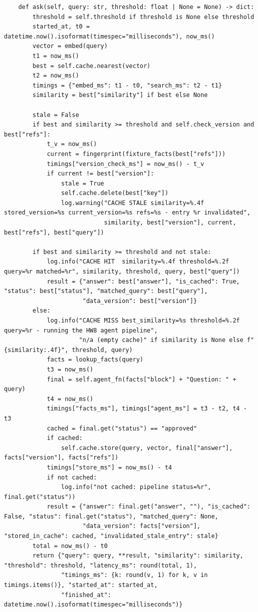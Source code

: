 \documentclass[11pt]{article}
\begin{document}
\begingroup\lstset{basicstyle=\ttfamily\tiny}
\begin{lstlisting}
    def ask(self, query: str, threshold: float | None = None) -> dict:
        threshold = self.threshold if threshold is None else threshold
        started_at, t0 = datetime.now().isoformat(timespec="milliseconds"), now_ms()
        vector = embed(query)
        t1 = now_ms()
        best = self.cache.nearest(vector)
        t2 = now_ms()
        timings = {"embed_ms": t1 - t0, "search_ms": t2 - t1}
        similarity = best["similarity"] if best else None

        stale = False
        if best and similarity >= threshold and self.check_version and best["refs"]:
            t_v = now_ms()
            current = fingerprint(fixture_facts(best["refs"]))
            timings["version_check_ms"] = now_ms() - t_v
            if current != best["version"]:
                stale = True
                self.cache.delete(best["key"])
                log.warning("CACHE STALE similarity=%.4f stored_version=%s current_version=%s refs=%s - entry %r invalidated",
                            similarity, best["version"], current, best["refs"], best["query"])

        if best and similarity >= threshold and not stale:
            log.info("CACHE HIT  similarity=%.4f threshold=%.2f query=%r matched=%r", similarity, threshold, query, best["query"])
            result = {"answer": best["answer"], "is_cached": True, "status": best["status"], "matched_query": best["query"],
                      "data_version": best["version"]}
        else:
            log.info("CACHE MISS best_similarity=%s threshold=%.2f query=%r - running the HW8 agent pipeline",
                     "n/a (empty cache)" if similarity is None else f"{similarity:.4f}", threshold, query)
            facts = lookup_facts(query)
            t3 = now_ms()
            final = self.agent_fn(facts["block"] + "Question: " + query)
            t4 = now_ms()
            timings["facts_ms"], timings["agent_ms"] = t3 - t2, t4 - t3
            cached = final.get("status") == "approved"
            if cached:
                self.cache.store(query, vector, final["answer"], facts["version"], facts["refs"])
            timings["store_ms"] = now_ms() - t4
            if not cached:
                log.info("not cached: pipeline status=%r", final.get("status"))
            result = {"answer": final.get("answer", ""), "is_cached": False, "status": final.get("status"), "matched_query": None,
                      "data_version": facts["version"], "stored_in_cache": cached, "invalidated_stale_entry": stale}
        total = now_ms() - t0
        return {"query": query, **result, "similarity": similarity, "threshold": threshold, "latency_ms": round(total, 1),
                "timings_ms": {k: round(v, 1) for k, v in timings.items()}, "started_at": started_at,
                "finished_at": datetime.now().isoformat(timespec="milliseconds")}
\end{lstlisting}
\end{document}
